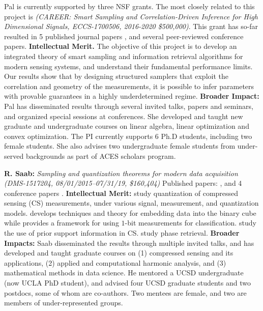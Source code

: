  Pal is currently supported by three NSF grants. The most closely related to this project is {\em  (CAREER: Smart Sampling and Correlation-Driven Inference for High Dimensional Signals, ECCS-1700506, 2016-2020 \$500,000)}. This grant has so-far resulted in 5 published journal papers \cite{koochakzadeh2017performance,koochakzadeh2017sparse,koochakzadeh2018fundamental,PalSPMag,HOS}, and several peer-reviewed conference papers. {\bf Intellectual Merit.} The objective of this project is to develop an integrated theory of smart sampling and information retrieval algorithms for modern sensing systems, and understand their fundamental performance limits. Our results show that by designing structured samplers that exploit the correlation and geometry of the measurements, it is possible to infer parameters with provable guarantees in a highly underdetermined regime. {\bf Broader Impact:} Pal has disseminated results through several invited talks, papers and seminars, and organized special sessions at conferences. She developed and taught new graduate and undergraduate courses on linear algebra, linear optimization and convex optimization. The PI currently supports 6 Ph.D students, including two female students. She also advises two undergraduate female students from under-served backgrounds as part of ACES scholars program. 



{\bf R. Saab:} {\em Sampling and quantization theorems for modern data acquisition (DMS-1517204, 08/01/2015--07/31/19,
\$160,404)}
Published papers: \cite{knudson2016one, mansour2017recovery, needell2017weighted, SaabIEEEIT, needell2018simple, LybrandSaab2018, iwen2018phase, huynh2018fast, feng2019quantized}, and 4 conference papers \cite{needell2017simple, feng2017quantized, iwen2018phase, iwen2019new}.  {\bf Intellectual Merit:}  \cite{knudson2016one, SaabIEEEIT, feng2019quantized, LybrandSaab2018, iwen2019new} study quantization of compressed sensing (CS) measurements, under various signal, measurement, and quantization models. \cite{huynh2018fast} develops techniques and theory for embedding data into the binary cube while  \cite{needell2018simple} provides a framework for using $1$-bit  measurements for classification. \cite{mansour2017recovery, needell2017weighted} study  the use of prior support information  in CS. \cite{iwen2018phase, iwen2017phase} study phase retrieval. %
{\bf Broader Impacts: }  Saab disseminated the results through multiple invited talks, and has developed and taught graduate courses on (1) compressed sensing and its applications, (2) applied and computational harmonic analysis, and (3) mathematical methods in data science. He mentored a UCSD undergraduate (now UCLA PhD student), and advised four UCSD graduate students and two postdocs,  some of whom are co-authors. Two  mentees are female, and two are members of under-represented groups.%

